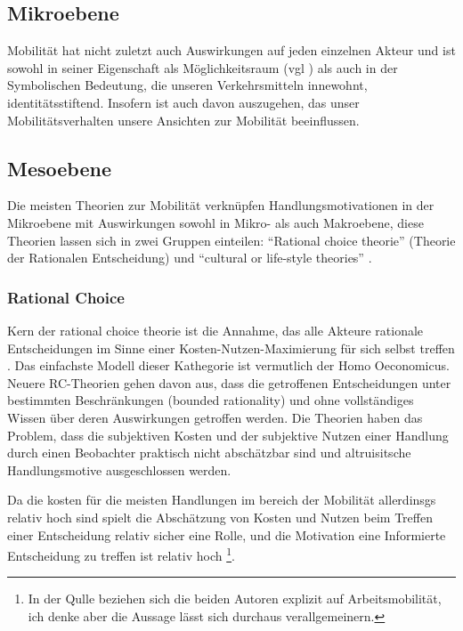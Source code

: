 \subsection{Mikroebene}
Mobilität hat nicht zuletzt auch Auswirkungen auf jeden einzelnen Akteur und ist sowohl in seiner Eigenschaft als Möglichkeitsraum (vgl \cite{riessman}) als auch in der Symbolischen Bedeutung, die unseren Verkehrsmitteln innewohnt, identitätsstiftend.
Insofern ist auch davon auszugehen, das unser Mobilitätsverhalten unsere Ansichten zur Mobilität beeinflussen.


\subsection{Mesoebene}

Die meisten Theorien zur Mobilität verknüpfen Handlungsmotivationen in der Mikroebene mit Auswirkungen sowohl in Mikro- als auch Makroebene, diese Theorien lassen sich in zwei Gruppen einteilen: \enquote{Rational choice theorie} (Theorie der Rationalen Entscheidung) und \enquote{cultural or life-style theories} \parencite{widmer}.

\subsubsection*{Rational Choice}
Kern der rational choice theorie ist die Annahme, das alle Akteure rationale Entscheidungen im Sinne einer Kosten-Nutzen-Maximierung für sich selbst treffen \parencite[][19]{wikiRationalChoice, widmer}.
Das einfachste Modell dieser Kathegorie ist vermutlich der Homo Oeconomicus.
Neuere RC-Theorien gehen davon aus, dass die getroffenen Entscheidungen unter bestimmten Beschränkungen (bounded rationality) und ohne vollständiges Wissen über deren Auswirkungen getroffen werden.
Die Theorien haben das Problem, dass die subjektiven Kosten und der subjektive Nutzen einer Handlung durch einen Beobachter praktisch nicht abschätzbar sind und altruisitsche Handlungsmotive ausgeschlossen werden.

Da die kosten für die meisten Handlungen im bereich der Mobilität allerdinsgs relativ hoch sind spielt die Abschätzung von Kosten und Nutzen beim Treffen einer Entscheidung relativ sicher eine Rolle, und die Motivation eine Informierte Entscheidung zu treffen ist relativ hoch \parencite[21]{widmer}\footnote{In der Qulle beziehen sich die beiden Autoren explizit auf Arbeitsmobilität, ich denke aber die Aussage lässt sich durchaus verallgemeinern.}.

